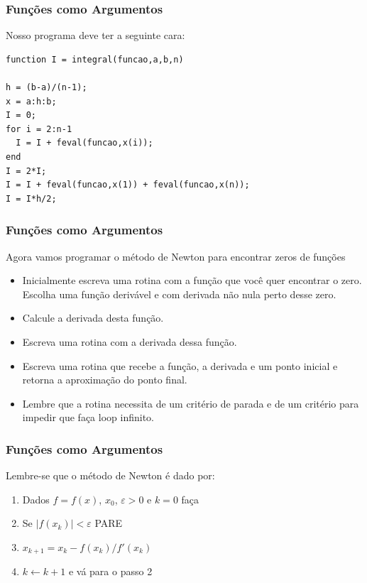 \documentclass{beamer}
\newcommand{\modulo}[1]{\vert #1 \vert}
\begin{document}
\begin{frame}[fragile]
 \frametitle {Fun\c{c}\~oes como Argumentos}

Nosso programa deve ter a seguinte cara:
\pause

\begin{verbatim}
function I = integral(funcao,a,b,n)

h = (b-a)/(n-1);
x = a:h:b;
I = 0;
for i = 2:n-1
  I = I + feval(funcao,x(i));
end
I = 2*I;
I = I + feval(funcao,x(1)) + feval(funcao,x(n));
I = I*h/2;
\end{verbatim}

\end{frame}

\begin{frame}
\frametitle {Fun\c{c}\~oes como Argumentos}
Agora vamos programar o m\'etodo de Newton para encontrar zeros de fun\c{c}\~oes
\begin{itemize}
 \item<2-> Inicialmente escreva uma rotina com a fun\c{c}\~ao que voc\^e quer encontrar o zero. Escolha uma fun\c{c}\~ao deriv\'avel e com derivada n\~ao nula perto desse zero.
 \item<3-> Calcule a derivada desta fun\c{c}\~ao.
 \item<4-> Escreva uma rotina com a derivada dessa fun\c{c}\~ao.
 \item<5-> Escreva uma rotina que recebe a fun\c{c}\~ao, a derivada e um ponto inicial e retorna a aproxima\c{c}\~ao do ponto final.
 \item<6-> Lembre que a rotina necessita de um crit\'erio de parada e de um crit\'erio para impedir que fa\c{c}a loop infinito.
\end{itemize}

\end{frame}

\begin{frame}
\frametitle {Fun\c{c}\~oes como Argumentos}
Lembre-se que o m\'etodo de Newton \'e dado por:
\begin{enumerate}
\item<2-> Dados $f = f(x)$, $x_0$, $\varepsilon > 0$ e $k = 0$ fa\c{c}a
\item<3-> Se $\modulo{f(x_k)} < \varepsilon$ PARE
\item<4-> $x_{k+1} = x_k - f(x_k)/f'(x_k)$
\item<5-> $k \leftarrow k+1$ e v\'a para o passo 2
\end{enumerate}

\end{frame}
\end{document}
